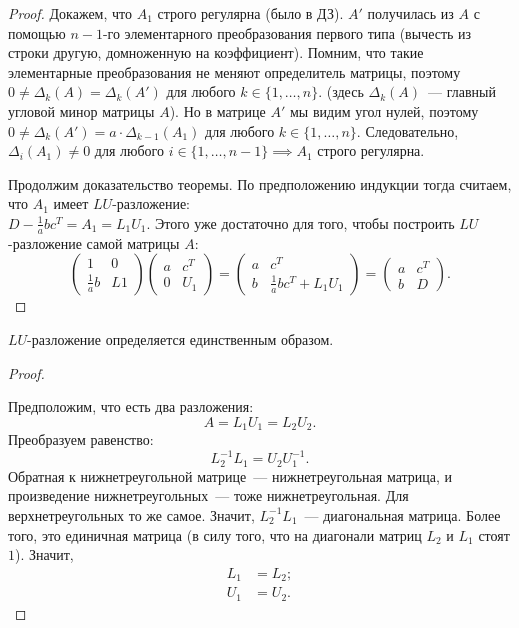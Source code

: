 \begin{proof}
    Докажем, что $A_1$ строго регулярна (было в ДЗ). $A'$ получилась из $A$ с помощью $n-1$-го элементарного преобразования первого типа (вычесть из строки другую, домноженную на коэффициент). Помним, что такие элементарные преобразования не меняют определитель матрицы, поэтому $0 \neq \Delta_k(A) = \Delta_k(A')$ для любого $k \in \{1, \dots, n\}$. (здесь $\Delta_k(A)$~--- главный угловой минор матрицы $A$). Но в матрице $A'$ мы видим угол нулей, поэтому $0 \neq \Delta_k(A') = a \cdot \Delta_{k-1}(A_1)$ для любого $k \in \{1, \dots, n \}$. Следовательно, $\Delta_{i}(A_1) \neq 0$ для любого $i \in \{1, \dots, n-1\} \implies A_1$ строго регулярна. 

    Продолжим доказательство теоремы. По предположению индукции тогда считаем, что $A_1$ имеет $LU$-разложение: \\[2pt] $D - \frac{1}{a}bc^T = A_1 = L_1U_1$. Этого уже достаточно для того, чтобы построить $LU$-разложение самой матрицы $A$:
    \begin{equation*}
        \begin{pmatrix}
            1 & 0 \\
            \frac{1}{a}b & L1
        \end{pmatrix} \begin{pmatrix}
            a & c^T \\
            0 & U_1
        \end{pmatrix} = \begin{pmatrix}
            a & c^T \\ 
            b & \frac{1}{a}bc^T + L_1U_1
        \end{pmatrix} = \begin{pmatrix}
            a & c^T \\ 
            b & D
        \end{pmatrix}.
    \end{equation*}

\end{proof}
\begin{proposition*}
    $LU$-разложение определяется единственным образом.
\end{proposition*}
\begin{proof}~

    Предположим, что есть два разложения:
    \begin{equation*}
        A = L_1 U_1 = L_2 U_2.
    \end{equation*}
    Преобразуем равенство:
    \begin{equation*}
        L_2^{-1}L_1 = U_2U_1^{-1}.
    \end{equation*}
    Обратная к нижнетреугольной матрице~--- нижнетреугольная матрица, и произведение нижнетреугольных~--- тоже нижнетреугольная. Для верхнетреугольных то же самое. Значит, $L_2^{-1}L_1$~--- диагональная матрица. Более того, это единичная матрица (в силу того, что на диагонали матриц $L_2$ и $L_1$ стоят $1$). Значит, 
    \begin{align*}
        L_1 &= L_2; \\
        U_1 &= U_2.
    \end{align*}
\end{proof}
